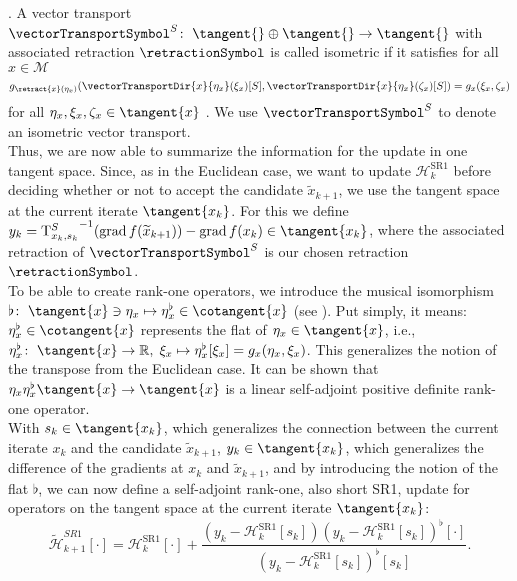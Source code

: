 \cite[Definition~8.1.1]{AbsilMahonySepulchre:2008}. A vector transport $\vectorTransportSymbol^S \colon \; \tangent{} \oplus \tangent{} \to \tangent{}$ with associated retraction $\retractionSymbol$ is called isometric if it satisfies for all $x \in \mathcal{M}$
\begin{equation}\label{IsometricVectorTransport}
    g_{\retract{x}(\eta_x)}(\vectorTransportDir{x}{\eta_x}(\xi_x)[S], \vectorTransportDir{x}{\eta_x}(\zeta_x)[S]) = g_x (\xi_x, \zeta_x)
\end{equation}
for all $\eta_x, \xi_x, \zeta_x \in \tangent{x}$ \cite[p.~10]{Huang:2013}. We use $\vectorTransportSymbol^S$ to denote an isometric vector transport. \\
Thus, we are now able to summarize the information for the update in one tangent space. Since, as in the Euclidean case, we want to update $\mathcal{H}^\mathrm{SR1}_k$ before deciding whether or not to accept the candidate $\widetilde{x}_{k+1}$, we use the tangent space at the current iterate $\tangent{x_k}$. For this we define $y_k = {\mathrm{T}^{S}_{x_k, s_k}}^{-1} ( \operatorname{grad}f(\widetilde{x}_{k+1}) ) - \operatorname{grad}f(x_k) \in \tangent{x_k}$, where the associated retraction of $\vectorTransportSymbol^S$ is our chosen retraction $\retractionSymbol$. \\
To be able to create rank-one operators, we introduce the musical isomorphism $\flat \colon \; \tangent{x} \ni \eta_{x} \mapsto \eta^{\flat}_{x} \in \cotangent{x}$ (see \cite[p.~6]{BergmannHerzogLouzeiroSilvaTenbrinckVidalNunez:2020:1}). Put simply, it means: $\eta^{\flat}_{x} \in \cotangent{x}$ represents the flat of $\eta_{x} \in \tangent{x}$, i.e., $\eta^{\flat}_{x} \colon \; \tangent{x} \to \mathbb{R}, \; \xi_{x} \mapsto \eta^{\flat}_{x}[\xi_{x}] = g_{x} (\eta_{x}, \xi_{x})$. This generalizes the notion of the transpose from the Euclidean case. It can be shown that $\eta_{x} \eta^{\flat}_{x} \tangent{x} \to \tangent{x}$ is a linear self-adjoint positive definite rank-one operator. \\
With $s_k \in \tangent{x_k}$, which generalizes the connection between the current iterate $x_k$ and the candidate $\widetilde{x}_{k+1}$, $y_k \in \tangent{x_k}$, which generalizes the difference of the gradients at $x_k$ and $\widetilde{x}_{k+1}$, and by introducing the notion of the flat $\flat$, we can now define a self-adjoint rank-one, also short SR1, update for operators on the tangent space at the current iterate $\tangent{x_k}$:
\begin{equation}\label{RiemannianDirectSR1formula}
    \widetilde{\mathcal{H}}^{SR1}_{k+1} [\cdot] = \mathcal{H}^\mathrm{SR1}_k [\cdot] + \frac{(y_k - \mathcal{H}^\mathrm{SR1}_k [s_k]) (y_k - \mathcal{H}^\mathrm{SR1}_k [s_k])^{\flat} [\cdot] }{(y_k - \mathcal{H}^\mathrm{SR1}_k [s_k])^{\flat} [s_k]}.
\end{equation}
